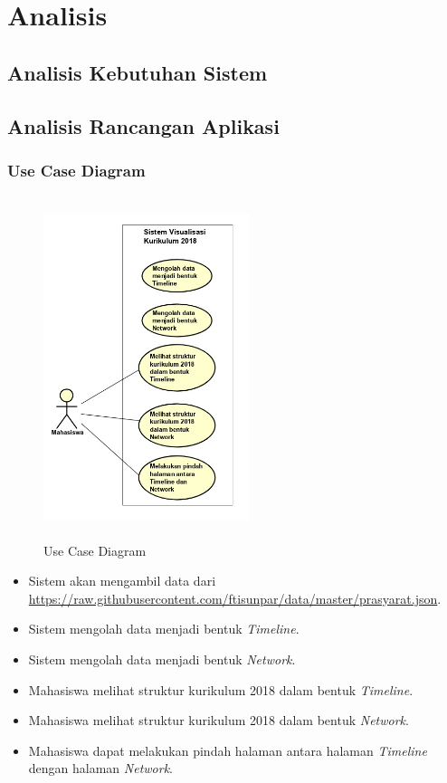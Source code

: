 \chapter{Analisis}
\label{chap:analisis}

\section{Analisis Kebutuhan Sistem}

\section{Analisis Rancangan Aplikasi}
\subsection{Use Case Diagram}
\begin{figure}[H]
    \centering
    \includegraphics[width=6cm, height=10cm]{Gambar/Use Case.jpg}
    \caption{Use Case Diagram}
    \label{fig:gambarUseCase}
\end{figure}

\begin{itemize}
    \item Sistem akan mengambil data dari \url{https://raw.githubusercontent.com/ftisunpar/data/master/prasyarat.json}.
    \item Sistem mengolah data menjadi bentuk \textit{Timeline}.
    \item Sistem mengolah data menjadi bentuk \textit{Network}.
    \item Mahasiswa melihat struktur kurikulum 2018 dalam bentuk \textit{Timeline}.
    \item Mahasiswa melihat struktur kurikulum 2018 dalam bentuk \textit{Network}.
    \item Mahasiswa dapat melakukan pindah halaman antara halaman \textit{Timeline} dengan halaman \textit{Network}.
\end{itemize}

